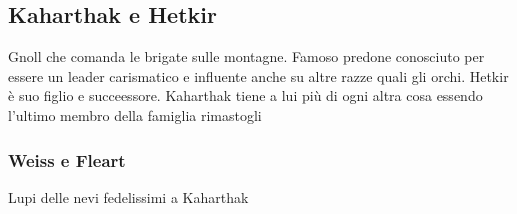\documentclass[10pt,twoside,twocolumn]{article}
\begin{document}
\subsection{Kaharthak e Hetkir}
Gnoll che comanda le brigate sulle montagne. Famoso predone conosciuto per essere
un leader carismatico e influente anche su altre razze quali gli orchi.
Hetkir \`e suo figlio e succeessore. Kaharthak tiene a lui pi\`u di ogni altra cosa
essendo l'ultimo membro della famiglia rimastogli
\subsubsection{Weiss e Fleart}
Lupi delle nevi fedelissimi a Kaharthak
\end{document}
